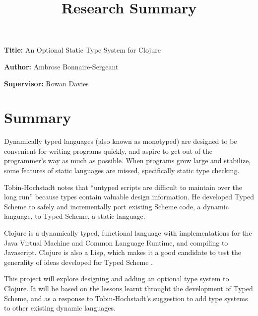 \documentclass[12pt, a4paper]{article}
\title{Research Summary}
\author{}
\date{}
\newcommand{\namelistlabel}[1]{\mbox{#1}\hfil}
\newenvironment{namelist}[1]{%
\begin{list}{}
    {
        \let\makelabel\namelistlabel
        \settowidth{\labelwidth}{#1}
        \setlength{\leftmargin}{1.1\labelwidth}
    }
  }{%
\end{list}}
\begin{document}
\maketitle

\begin{namelist}{xxxxxxxxxxxx}
\item[{\bf Title:}]
	An Optional Static Type System for Clojure
\item[{\bf Author:}]
	Ambrose Bonnaire-Sergeant
\item[{\bf Supervisor:}]
	Rowan Davies
\end{namelist}

\section*{Summary} 

Dynamically typed languages (also known as monotyped) are designed to be convenient for
writing programs quickly, and aspire to get out of the programmer's
way as much as possible. When programs grow large and stabilize,
some features of static languages are missed, specifically static
type checking. 

Tobin-Hochstadt notes that ``untyped scripts are difficult to 
maintain over the long run'' \cite{TypedScheme:2010} because types
contain valuable design information.
He developed Typed Scheme
\cite{TypedScheme:2010} 
to safely and incrementally port existing Scheme code, a dynamic language, to
Typed Scheme, a static language.

Clojure is a dynamically typed, functional language with implementations for the Java Virtual
Machine and Common Language Runtime, and compiling to Javascript. Clojure
is also a Lisp, which makes it a good candidate to test the generality of
ideas developed for Typed Scheme \cite{TypedScheme:2010}.

This project will explore designing and adding an optional type system to Clojure.
It will be based on the lessons learnt throught the development
of Typed Scheme, and as a response to Tobin-Hochstadt's \cite{TypedScheme:2010}
suggestion to add type systems to other existing dynamic languages.

\printbibliography
\end{document}
